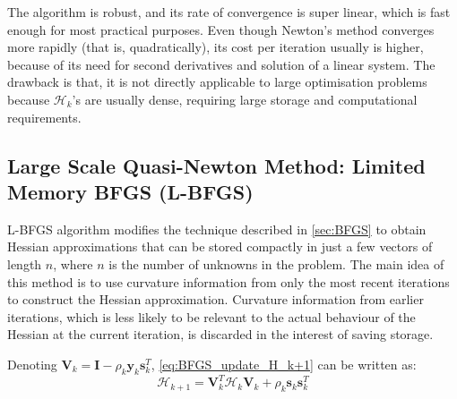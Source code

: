 The algorithm is robust, and its rate of convergence is super linear, which is fast enough for most practical purposes. Even though Newton's method converges more rapidly (that is, quadratically), its cost per iteration usually is higher, because of its need for second derivatives and solution of a linear system. The drawback is that, it is not directly applicable to large optimisation problems because $\mathcal{H}_k$'s are usually dense, requiring large storage and computational requirements. \cite{Nocedal2006}


\subsection{Large Scale Quasi-Newton Method: Limited Memory BFGS (L-BFGS)}\label{sec:L-BFGS}
L-BFGS algorithm \cite{Liu1989} modifies the technique described in \cref{sec:BFGS} to obtain Hessian approximations that can be stored compactly in just a few vectors of length $n$, where $n$ is the number of unknowns in the problem. The main idea of this method is to use curvature information from only the most recent iterations to construct the Hessian approximation. Curvature information from earlier iterations, which is less likely to be relevant to the actual behaviour of the Hessian at the current iteration, is discarded in the interest of saving storage. \cite{Nocedal2006}

Denoting $\textbf{V}_k = \textbf{I} - \rho_k\textbf{y}_k\textbf{s}_k^T$, \cref{eq:BFGS_update_H_k+1} can be written as:
\begin{equation}
  \mathcal{H}_{k+1} = \textbf{V}_k^T \mathcal{H}_{k} \textbf{V}_k +\rho_k\textbf{s}_k\textbf{s}_k^T
\end{equation}

